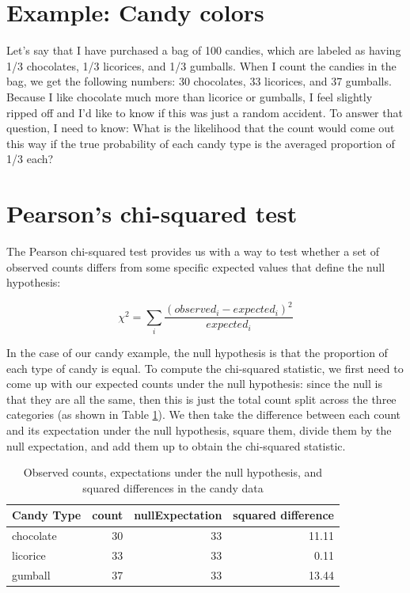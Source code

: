 \documentclass[
  12pt,
]{book}
\begin{document}
\hypertarget{example-candy-colors}{%
\section{Example: Candy colors}\label{example-candy-colors}}

Let's say that I have purchased a bag of 100 candies, which are labeled as having 1/3 chocolates, 1/3 licorices, and 1/3 gumballs. When I count the candies in the bag, we get the following numbers: 30 chocolates, 33 licorices, and 37 gumballs. Because I like chocolate much more than licorice or gumballs, I feel slightly ripped off and I'd like to know if this was just a random accident. To answer that question, I need to know: What is the likelihood that the count would come out this way if the true probability of each candy type is the averaged proportion of 1/3 each?

\hypertarget{chi-squared-test}{%
\section{Pearson's chi-squared test}\label{chi-squared-test}}

The Pearson chi-squared test provides us with a way to test whether a set of observed counts differs from some specific expected values that define the null hypothesis:

\[
\chi^2 = \sum_i\frac{(observed_i - expected_i)^2}{expected_i}
\]

In the case of our candy example, the null hypothesis is that the proportion of each type of candy is equal. To compute the chi-squared statistic, we first need to come up with our expected counts under the null hypothesis: since the null is that they are all the same, then this is just the total count split across the three categories (as shown in Table \ref{tab:candyDf}). We then take the difference between each count and its expectation under the null hypothesis, square them, divide them by the null expectation, and add them up to obtain the chi-squared statistic.

\begin{table}

\caption{\label{tab:candyDf}Observed counts, expectations under the null hypothesis, and squared differences in the candy data}
\centering
\begin{tabular}[t]{l|r|r|r}
\hline
Candy Type & count & nullExpectation & squared difference\\
\hline
chocolate & 30 & 33 & 11.11\\
\hline
licorice & 33 & 33 & 0.11\\
\hline
gumball & 37 & 33 & 13.44\\
\hline
\end{tabular}
\end{table}
\end{document}
